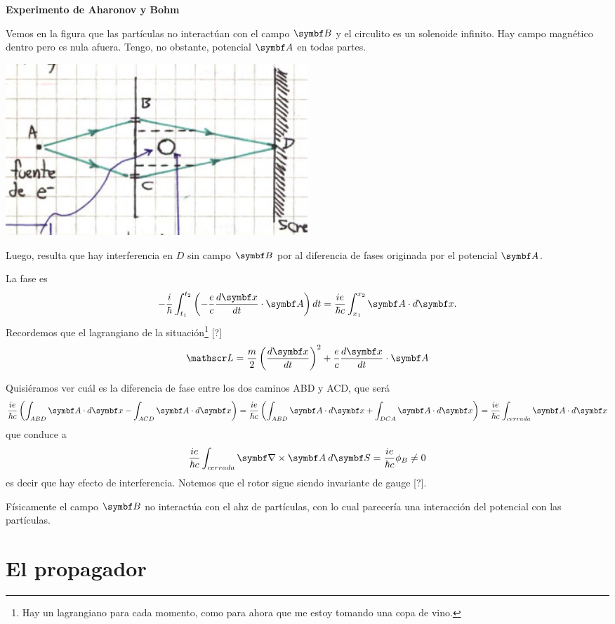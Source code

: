 \documentclass[10pt,oneside]{CBFT_book}
\begin{document}
\begin{ejemplo}{\bf Experimento de Aharonov y Bohm}

Vemos en la figura que las partículas no interactúan con el campo $\vb B$ y el circulito es un solenoide
infinito. Hay campo magnético dentro pero es nula afuera. Tengo, no obstante, potencial $\vb A$ en todas
partes.

\includegraphics[width=0.5\textwidth]{images/fig_ft2_aharonov_bohm.jpg} 

Luego, resulta que hay interferencia en $D$ sin campo $\vb B$ por al diferencia de fases originada por el potencial
$\vb A$.

La fase es
\[
	- \frac{i}{\hbar} \int_{t_1}^{t_2} \left( - \frac{e}{c} \dtot{\vb x}{t} \cdot \vb A\right) dt=
	\frac{i e}{\hbar c} \int_{x_1}^{x_2} \vb A \cdot d\vb x.
\]
Recordemos que el lagrangiano de la situación\footnote{Hay un lagrangiano para cada momento, como para ahora
que me estoy tomando una copa de vino.} [?]
\[
	\Lag = \frac{m}{2} \Dtot{\vb x}{t}^2 + \frac{e}{c} \dtot{\vb x}{t}\cdot\vb A
\]

Quisiéramos ver cuál es la diferencia de fase entre los dos caminos ABD y ACD, que será
\[
	\frac{ie}{\hbar c} \left( \int_{ABD} \vb A\cdot d\vb x - \int_{ACD} \vb A\cdot d\vb x \right) =
	\frac{ie}{\hbar c} \left( \int_{ABD} \vb A\cdot d\vb x + \int_{DCA} \vb A\cdot d\vb x \right) =
	\frac{ie}{\hbar c}  \int_{cerrada} \vb A\cdot d\vb x
\]
que conduce a
\[
	\frac{ie}{\hbar c}  \int_{cerrada} \rotorm{A} \: d\vb S = \frac{ie}{\hbar c} \phi_B \neq 0
\]
es decir que hay efecto de interferencia. Notemos que el rotor sigue siendo invariante de gauge [?].

Físicamente el campo $\vb B$ no interactúa con el ahz de partículas, con lo cual parecería una interacción
del potencial con las partículas.
 
\end{ejemplo}


\section{El propagador}
\end{document}
